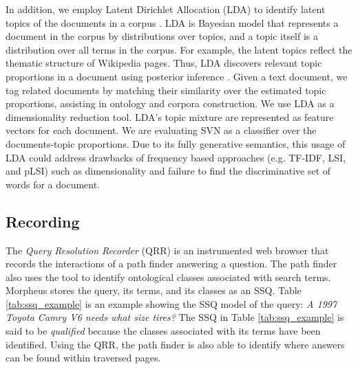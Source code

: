 In addition, we employ Latent Dirichlet Allocation (LDA) to identify latent topics of the documents in a corpus \cite{Blei2003latentdirichlet}.  LDA is Bayesian model that represents a document in the corpus by distributions over topics, and a topic itself is a distribution over all terms in the corpus.  For example, the latent topics reflect the thematic structure of Wikipedia pages. Thus, LDA discovers relevant topic proportions in a document using posterior inference \cite{Blei2003latentdirichlet}. Given a text document, we tag related documents by matching their similarity over the estimated topic proportions, assisting in ontology and corpora construction. We use LDA as a dimensionality reduction tool. LDA's topic mixture are represented as feature vectors for each document. We are evaluating SVN as a classifier over the documents-topic proportions.  Due to its fully generative semantics, this usage of LDA could address drawbacks of frequency based approaches (e.g. TF-IDF, LSI, and pLSI) such as dimensionality and failure to find the discriminative set of words for a document. 


\subsection{Recording}
\label{sec:query_processing}

The \emph{Query Resolution Recorder} (QRR) is an instrumented web browser that records the interactions of a path finder answering a question. The path finder also uses the tool to identify ontological classes associated with search terms. Morpheus stores the query, its terms, and its classes as an SSQ.  Table \ref{tab:ssq_example} is an example showing the SSQ model of the query: \emph{ A 1997 Toyota Camry V6 needs what size tires?} The SSQ in Table \ref{tab:ssq_example} is said to be \emph{qualified} because the classes associated with its terms have been identified. Using the QRR, the path finder is also able to identify where answers can be found within traversed pages.





